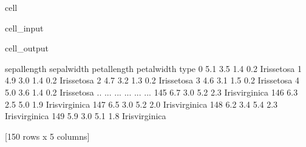 \documentclass[letterpaper,10pt,english]{jupyterBook}
\begin{document}
\begin{sphinxuseclass}{cell}\begin{sphinxVerbatimInput}

\begin{sphinxuseclass}{cell_input}
\begin{sphinxVerbatim}[commandchars=\\\{\}]
  \PYG{p}{[}    \PYG{p}{]}
      
 
\end{sphinxVerbatim}

\end{sphinxuseclass}\end{sphinxVerbatimInput}
\begin{sphinxVerbatimOutput}

\begin{sphinxuseclass}{cell_output}
\begin{sphinxVerbatim}[commandchars=\\\{\}]
     sepal\PYGZhy{}length  sepal\PYGZhy{}width  petal\PYGZhy{}length  petal\PYGZhy{}width            type
0             5.1          3.5           1.4          0.2     Iris\PYGZhy{}setosa
1             4.9          3.0           1.4          0.2     Iris\PYGZhy{}setosa
2             4.7          3.2           1.3          0.2     Iris\PYGZhy{}setosa
3             4.6          3.1           1.5          0.2     Iris\PYGZhy{}setosa
4             5.0          3.6           1.4          0.2     Iris\PYGZhy{}setosa
..            ...          ...           ...          ...             ...
145           6.7          3.0           5.2          2.3  Iris\PYGZhy{}virginica
146           6.3          2.5           5.0          1.9  Iris\PYGZhy{}virginica
147           6.5          3.0           5.2          2.0  Iris\PYGZhy{}virginica
148           6.2          3.4           5.4          2.3  Iris\PYGZhy{}virginica
149           5.9          3.0           5.1          1.8  Iris\PYGZhy{}virginica

[150 rows x 5 columns]
\end{sphinxVerbatim}

\end{sphinxuseclass}\end{sphinxVerbatimOutput}

\end{sphinxuseclass}
\end{document}
